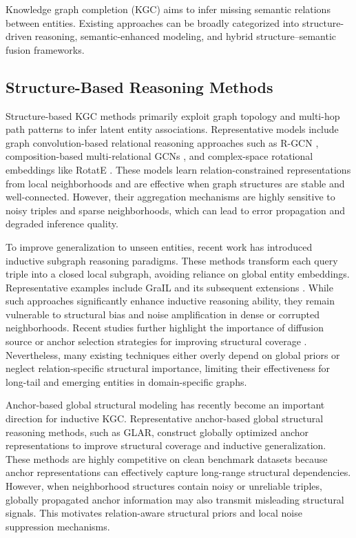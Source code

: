 \documentclass[preprint,12pt]{elsarticle}
\begin{document}
Knowledge graph completion (KGC) aims to infer missing semantic relations between entities. Existing approaches can be broadly categorized into structure-driven reasoning, semantic-enhanced modeling, and hybrid structure–semantic fusion frameworks.

\subsection{Structure-Based Reasoning Methods}

Structure-based KGC methods primarily exploit graph topology and multi-hop path patterns to infer latent entity associations. Representative models include graph convolution-based relational reasoning approaches such as R-GCN \cite{schlichtkrull}, composition-based multi-relational GCNs \cite{composition-gcn}, and complex-space rotational embeddings like RotatE \cite{rotatE}. These models learn relation-constrained representations from local neighborhoods and are effective when graph structures are stable and well-connected. However, their aggregation mechanisms are highly sensitive to noisy triples and sparse neighborhoods, which can lead to error propagation and degraded inference quality.

To improve generalization to unseen entities, recent work has introduced inductive subgraph reasoning paradigms. These methods transform each query triple into a closed local subgraph, avoiding reliance on global entity embeddings. Representative examples include GraIL \cite{subgraph-inductive-2020} and its subsequent extensions \cite{cmp,topology-aware,reinception}. While such approaches significantly enhance inductive reasoning ability, they remain vulnerable to structural bias and noise amplification in dense or corrupted neighborhoods. Recent studies further highlight the importance of diffusion source or anchor selection strategies for improving structural coverage \cite{anchors-inc,nodepiece,clustering-prop,query-anchor}. Nevertheless, many existing techniques either overly depend on global priors or neglect relation-specific structural importance, limiting their effectiveness for long-tail and emerging entities in domain-specific graphs.

Anchor-based global structural modeling has recently become an important direction for inductive KGC. Representative anchor-based global structural reasoning methods, such as GLAR, construct globally optimized anchor representations to improve structural coverage and inductive generalization. These methods are highly competitive on clean benchmark datasets because anchor representations can effectively capture long-range structural dependencies. However, when neighborhood structures contain noisy or unreliable triples, globally propagated anchor information may also transmit misleading structural signals. This motivates relation-aware structural priors and local noise suppression mechanisms.
\end{document}
